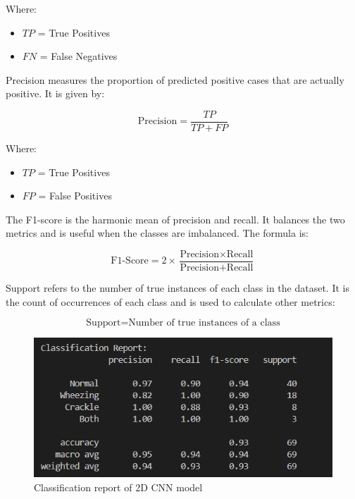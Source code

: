\documentclass[conference]{IEEEtran}
\begin{document}
{Where:
\begin{itemize}
    \item \( TP \) = True Positives
    \item \( FN \) = False Negatives
\end{itemize}

Precision measures the proportion of predicted positive cases that are actually positive. It is given by:

\[
\text{Precision} = \frac{TP}{TP + FP}
\]

Where:
\begin{itemize}
    \item \( TP \) = True Positives
    \item \( FP \) = False Positives
\end{itemize}

The F1-score is the harmonic mean of precision and recall. It balances the two metrics and is useful when the classes are imbalanced. The formula is:

\[
\text{F1-Score} = 2 \times \frac{\text{Precision} \times \text{Recall}}{\text{Precision} + \text{Recall}}
\]

Support refers to the number of true instances of each class in the dataset. It is the count of occurrences of each class and is used to calculate other metrics:

\[
\text{Support} = \text{Number of true instances of a class}
\]


\begin{figure}
    \centering
    \includegraphics[width=0.8\linewidth]{Images/Screenshot 2024-11-12 133318.png}
    \caption{Classification report of 2D CNN model}
    \label{fig:spectral-gating}
\end{figure}

}
\end{document}
